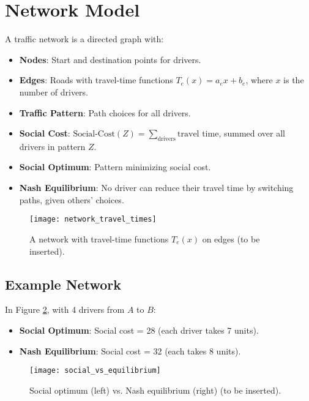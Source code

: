 \documentclass[a4paper,12pt]{article}
\begin{document}
\section{Network Model}
A traffic network is a directed graph with:
\begin{itemize}
    \item \textbf{Nodes}: Start and destination points for drivers.
    \item \textbf{Edges}: Roads with travel-time functions \( T_e(x) = a_e x + b_e \), where \( x \) is the number of drivers.
    \item \textbf{Traffic Pattern}: Path choices for all drivers.
    \item \textbf{Social Cost}: \( \text{Social-Cost}(Z) = \sum_{\text{drivers}} \text{travel time} \), summed over all drivers in pattern \( Z \).
    \item \textbf{Social Optimum}: Pattern minimizing social cost.
    \item \textbf{Nash Equilibrium}: No driver can reduce their travel time by switching paths, given others' choices.
\end{itemize}

\begin{figure}[h]
    \centering
    \texttt{[image: network\_travel\_times]} %
    \caption{A network with travel-time functions \( T_e(x) \) on edges (to be inserted).}
    \label{fig:network}
\end{figure}

\subsection{Example Network}
In Figure \ref{fig:network_social}, with 4 drivers from \( A \) to \( B \):
\begin{itemize}
    \item \textbf{Social Optimum}: Social cost = 28 (each driver takes 7 units).
    \item \textbf{Nash Equilibrium}: Social cost = 32 (each takes 8 units).
\end{itemize}

\begin{figure}[h]
    \centering
    \texttt{[image: social\_vs\_equilibrium]} %
    \caption{Social optimum (left) vs. Nash equilibrium (right) (to be inserted).}
    \label{fig:network_social}
\end{figure}
\end{document}
